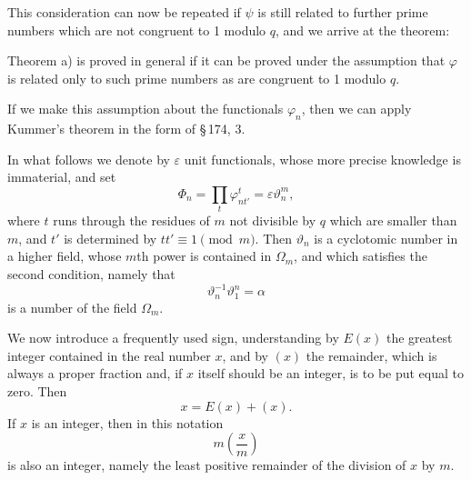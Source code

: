 \documentclass[11pt]{article}
\begin{document}
This consideration can now be repeated if $\psi$ is still related to further prime numbers which are not congruent to 1 modulo $q$, and we arrive at the theorem:
\begin{center}
Theorem a) is proved in general if it can be proved under the assumption that $\varphi$ is related only to such prime numbers as are congruent to 1 modulo $q$.
\end{center}

If we make this assumption about the functionals $\varphi_n$, then we can apply Kummer's theorem in the form of \S\,174, 3.

In what follows we denote by $\varepsilon$ unit functionals, whose more precise knowledge is immaterial, and set
\begin{equation}
\Phi_n=\prod_t \varphi_{nt'}^{t}=\varepsilon\vartheta_n^m,
\tag{7}
\end{equation}
where $t$ runs through the residues of $m$ not divisible by $q$ which are smaller than $m$, and $t'$ is determined by $tt'\equiv1\pmod m$. Then $\vartheta_n$ is a cyclotomic number in a higher field, whose $m$th power is contained in $\Omega_m$, and which satisfies the second condition, namely that
\begin{equation}
\vartheta_n^{-1}\vartheta_1^n=\alpha
\tag{8}
\end{equation}
is a number of the field $\Omega_m$.

We now introduce a frequently used sign, understanding by $E(x)$ the greatest integer contained in the real number $x$, and by $(x)$ the remainder, which is always a proper fraction and, if $x$ itself should be an integer, is to be put equal to zero. Then
\begin{equation}
x=E(x)+(x).
\tag{9}
\end{equation}
If $x$ is an integer, then in this notation
\[
m\left(\frac xm\right)
\]
is also an integer, namely the least positive remainder of the division of $x$ by $m$.
\end{document}
